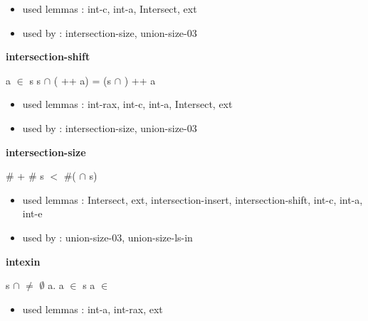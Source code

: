 \documentclass[a4paper]{article}
\begin{document}
\begin{itemize}


\item       used lemmas  : int-c, int-a, Intersect, ext
\item       used by      : intersection-size, union-size-03

\end{itemize}

\medskip

\bigskip

{\large\bf intersection-shift}

\medskip

 \Fol a $\in$ s \Imp s $\cap$ ( ++ a) = (s $\cap$ ) ++ a

\begin{itemize}


\item       used lemmas  : int-rax, int-c, int-a, Intersect, ext
\item       used by      : intersection-size, union-size-03

\end{itemize}

\medskip

\bigskip

{\large\bf intersection-size}

\medskip

 \Fol \Not \#  + \# s $<$ \#( $\cap$ s)

\begin{itemize}


\item       used lemmas  : Intersect, ext, intersection-insert, intersection-shift, int-c, int-a, int-e
\item       used by      : union-size-03, union-size-ls-in

\end{itemize}

\medskip

\bigskip

{\large\bf intexin}

\medskip

s $\cap$  $\neq$ $\emptyset$ \Fol \Ex a. a $\in$ s \And a $\in$ 

\begin{itemize}


\item       used lemmas  : int-a, int-rax, ext

\end{itemize}
\end{document}
